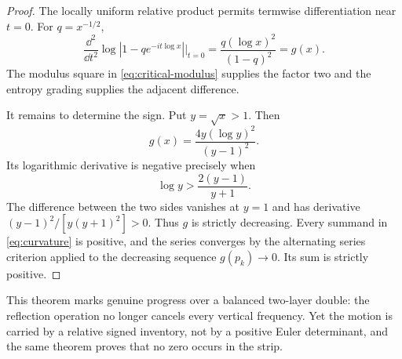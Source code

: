 \begin{proof}
The locally uniform relative product permits termwise differentiation near
$t=0$.  For $q=x^{-1/2}$,
\[
 \frac{\dd^2}{\dd t^2}
 \log|1-qe^{-it\log x}|\bigg|_{t=0}
 =\frac{q(\log x)^2}{(1-q)^2}=g(x).             \tag{5.7}
\]
The modulus square in \cref{eq:critical-modulus} supplies the factor two and
the entropy grading supplies the adjacent difference.

It remains to determine the sign.  Put $y=\sqrt{x}>1$.  Then
\[
 g(x)=\frac{4y(\log y)^2}{(y-1)^2}.
\]
Its logarithmic derivative is negative precisely when
\[
 \log y>\frac{2(y-1)}{y+1}.                     \tag{5.8}
\]
The difference between the two sides vanishes at $y=1$ and has derivative
$(y-1)^2/[y(y+1)^2]>0$.  Thus $g$ is strictly decreasing.  Every summand in
\eqref{eq:curvature} is positive, and the series converges by the alternating
series criterion applied to the decreasing sequence $g(p_k)\to0$.  Its sum is
strictly positive.
\end{proof}

This theorem marks genuine progress over a balanced two-layer double: the
reflection operation no longer cancels every vertical frequency.  Yet the
motion is carried by a relative signed inventory, not by a positive Euler
determinant, and the same theorem proves that no zero occurs in the strip.
